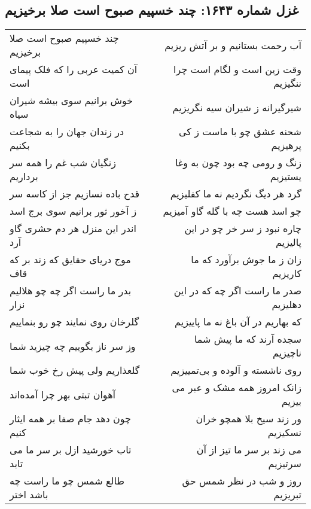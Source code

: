 \begin{center}
\section*{غزل شماره ۱۶۴۳: چند خسپیم صبوح است صلا برخیزیم}
\label{sec:1643}
\begin{longtable}{l p{0.5cm} r}
چند خسپیم صبوح است صلا برخیزیم
&&
آب رحمت بستانیم و بر آتش ریزیم
\\
آن کمیت عربی را که فلک پیمای است
&&
وقت زین است و لگام است چرا ننگیزیم
\\
خوش برانیم سوی بیشه شیران سیاه
&&
شیرگیرانه ز شیران سیه نگریزیم
\\
در زندان جهان را به شجاعت بکنیم
&&
شحنه عشق چو با ماست ز کی پرهیزیم
\\
زنگیان شب غم را همه سر برداریم
&&
زنگ و رومی چه بود چون به وغا یستیزیم
\\
قدح باده نسازیم جز از کاسه سر
&&
گرد هر دیگ نگردیم نه ما کفلیزیم
\\
ز آخور ثور برانیم سوی برج اسد
&&
چو اسد هست چه با گله گاو آمیزیم
\\
اندر این منزل هر دم حشری گاو آرد
&&
چاره نبود ز سر خر چو در این پالیزیم
\\
موج دریای حقایق که زند بر که قاف
&&
زان ز ما جوش برآورد که ما کاریزیم
\\
بدر ما راست اگر چه چو هلالیم نزار
&&
صدر ما راست اگر چه که در این دهلیزیم
\\
گلرخان روی نمایند چو رو بنماییم
&&
که بهاریم در آن باغ نه ما پاییزیم
\\
وز سر ناز بگوییم چه چیزید شما
&&
سجده آرند که ما پیش شما ناچیزیم
\\
گلعذاریم ولی پیش رخ خوب شما
&&
روی ناشسته و آلوده و بی‌تمییزیم
\\
آهوان تبتی بهر چرا آمده‌اند
&&
زانک امروز همه مشک و عبر می بیزیم
\\
چون دهد جام صفا بر همه ایثار کنیم
&&
ور زند سیخ بلا همچو خران نسکیزیم
\\
تاب خورشید ازل بر سر ما می تابد
&&
می زند بر سر ما تیز از آن سرتیزیم
\\
طالع شمس چو ما راست چه باشد اختر
&&
روز و شب در نظر شمس حق تبریزیم
\\
\end{longtable}
\end{center}
